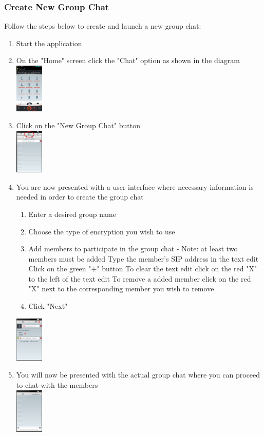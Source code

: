\documentclass[11pt]{article}
\begin{document}
\subsubsection{Create New Group Chat} \label{create}
Follow the steps below to create and launch a new group chat:
\begin{enumerate}
\item Start the application
\item On the "Home" screen click the "Chat" option as shown in the diagram\\
\includegraphics[width=50px]{images/mainScreen.png}
\item Click on the "New Group Chat" button\\
\includegraphics[width=50px]{images/ChatlistCG.png}
\item You are now presented with a user interface where necessary information is needed in order to create the group chat
\begin{enumerate}
\item Enter a desired group name
\item Choose the type of encryption you wish to use
\item Add members to participate in the group chat - Note: at least two members must be added
\subitem Type the member's SIP address in the text edit
\subitem Click on the green "+" button
\subitem To clear the text edit click on the red "X" to the left of the text edit
\subitem To remove a added member click on the red "X" next to the corresponding member you wish to remove
\item Click "Next"
\end{enumerate}
\includegraphics[width=50px]{images/GroupChatCreation.png}
\item You will now be presented with the actual group chat where you can proceed to chat with the members\\
\includegraphics[width=50px]{images/groupchat.png}
\end{enumerate}
\end{document}
